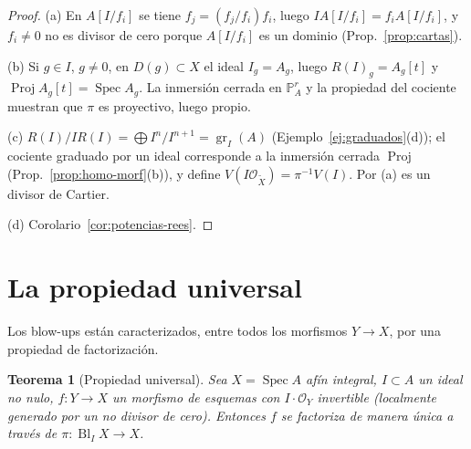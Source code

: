 \documentclass[11pt,a4paper,oneside]{book}
\newcommand{\Spec}{\operatorname{Spec}}
\newcommand{\Proj}{\operatorname{Proj}}
\newcommand{\Bl}{\operatorname{Bl}}
\newcommand{\gr}{\operatorname{gr}}
\newcommand{\PP}{\mathbb{P}}
\newcommand{\cO}{\mathcal{O}}
\theoremstyle{plain}
\newtheorem{teorema}{Teorema}[chapter]
\theoremstyle{definition}
\theoremstyle{remark}
\begin{document}
\begin{proof}
(a) En $A[I/f_i]$ se tiene $f_j=(f_j/f_i)f_i$, luego $IA[I/f_i]=f_iA[I/f_i]$, y $f_i\ne0$ no es divisor de cero porque $A[I/f_i]$ es un dominio (Prop.~\ref{prop:cartas}).

(b) Si $g\in I$, $g\ne0$, en $D(g)\subset X$ el ideal $I_g=A_g$, luego $R(I)_g=A_g[t]$ y $\Proj A_g[t]=\Spec A_g$. La inmersión cerrada en $\PP^r_A$ y la propiedad del cociente muestran que $\pi$ es proyectivo, luego propio.

(c) $R(I)/IR(I)=\bigoplus I^n/I^{n+1}=\gr_I(A)$ (Ejemplo~\ref{ej:graduados}(d)); el cociente graduado por un ideal corresponde a la inmersión cerrada $\Proj$ (Prop.~\ref{prop:homo-morf}(b)), y define $V(I\cO_{\tilde X})=\pi^{-1}V(I)$. Por (a) es un divisor de Cartier.

(d) Corolario~\ref{cor:potencias-rees}.
\end{proof}

\section{La propiedad universal}\label{sec:universal}

Los blow-ups están caracterizados, entre todos los morfismos $Y\to X$, por una propiedad de factorización.

\begin{teorema}[Propiedad universal]\label{teo:universal}
Sea $X=\Spec A$ afín integral, $I\subset A$ un ideal no nulo, $f:Y\to X$ un morfismo de esquemas con $I\cdot\cO_Y$ \emph{invertible} (localmente generado por un no divisor de cero). Entonces $f$ se factoriza de manera \emph{única} a través de $\pi:\Bl_IX\to X$.
\end{teorema}
\end{document}
